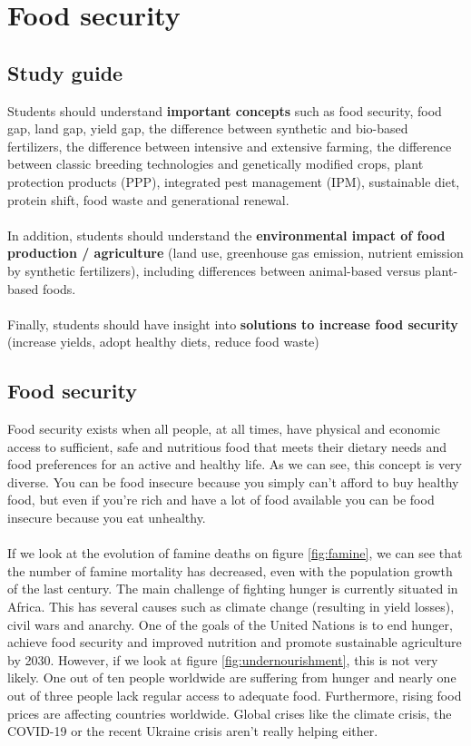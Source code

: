 \documentclass[../summary.tex]{subfiles}
\begin{document}
	
	\section{Food security}
	
	\subsection{Study guide}
	
	Students should understand \textbf{important concepts} such as food security, food gap, land gap, yield gap, the difference between synthetic and bio-based fertilizers, the difference between intensive and extensive farming, the difference between classic breeding technologies and genetically modified crops, plant protection products (PPP), integrated pest management (IPM), sustainable diet, protein shift, food waste and generational renewal.
	\\\\
	In addition, students should understand the \textbf{environmental impact of food production / agriculture} (land use, greenhouse gas emission, nutrient emission by synthetic fertilizers), including differences between animal-based versus plant-based foods.
	\\\\
	Finally, students should have insight into \textbf{solutions to increase food security} (increase yields, adopt healthy
	diets, reduce food waste)
	
	\subsection{Food security}
	
	Food security exists when all people, at all times, have physical and economic access to sufficient, safe and nutritious food that meets their dietary needs and food preferences for an active and healthy life. As we can see, this concept is very diverse. You can be food insecure because you simply can't afford to buy healthy food, but even if you're rich and have a lot of food available you can be food insecure because you eat unhealthy. 
	\\\\
	If we look at the evolution of famine deaths on figure \ref{fig:famine}, we can see that the number of famine mortality has decreased, even with the population growth of the last century. The main challenge of fighting hunger is currently situated in Africa. This has several causes such as climate change (resulting in yield losses), civil wars and anarchy. One of the goals of the United Nations is to end hunger, achieve food security and improved nutrition and promote sustainable agriculture by 2030. However, if we look at figure \ref{fig:undernourishment}, this is not very likely. One out of ten people worldwide are suffering from hunger and nearly one out of three people lack regular access to adequate food. Furthermore, rising food prices are affecting countries worldwide. Global crises like the climate crisis, the COVID-19  or the recent Ukraine crisis aren't really helping either.
	
\end{document}
